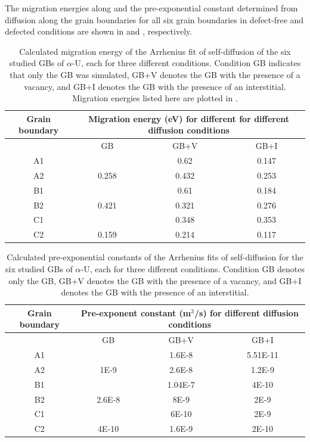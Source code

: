 \documentclass[review]{elsarticle}
\begin{document}
\FloatBarrier

The migration energies along and the pre-exponential constant determined from diffusion along the grain boundaries for all six grain boundaries in defect-free and defected conditions are shown in  and , respectively. 

{\footnotesize
\begin{table}[h!]
    \centering
    \caption{Calculated migration energy of the Arrhenius fit of self-diffusion of the six studied GBs of $\alpha$-U, each for three different conditions. Condition GB indicates that only the GB was simulated, GB+V denotes the GB with the presence of a vacancy, and GB+I denotes the GB with the presence of an interstitial. Migration energies listed here are plotted in . \label{tab:migra}}
\begin{tabular}{|c|c|c|c|}
\hline
\multicolumn{1}{|c}{Grain boundary}
& \multicolumn{3}{|c|}{Migration energy (eV) for different for different diffusion conditions} \\
\hline
 & GB & GB+V & GB+I \\
\hline
A1 &  & 0.62 & 0.147 \\
A2 & 0.258 & 0.432 & 0.253 \\
B1 &  & 0.61 & 0.184 \\
B2 & 0.421 & 0.321 & 0.276 \\
C1 &  & 0.348 & 0.353 \\
C2 & 0.159 & 0.214 & 0.117 \\
\hline
\end{tabular}
\end{table}

\begin{table}[h!]
    \centering
    \caption{Calculated pre-exponential constants of the Arrhenius fits of self-diffusion for the six studied GBs of $\alpha$-U, each for three different conditions. Condition GB denotes only the GB, GB+V denotes the GB with the presence of a vacancy, and GB+I denotes the GB with the presence of an interstitial.\label{tab:pre}}
    \begin{tabular}{|c|c|c|c|}
   \hline
\multicolumn{1}{|c}{Grain boundary}
& \multicolumn{3}{|c|}{ Pre-exponent constant (m$^3$/s) for different diffusion conditions} \\
\hline
 & GB & GB+V & GB+I \\
\hline
A1 &  & 1.6E-8 & 5.51E-11 \\
A2 & 1E-9 & 2.6E-8 & 1.2E-9 \\
B1 &  & 1.04E-7 & 4E-10 \\
B2 & 2.6E-8 & 8E-9 & 2E-9 \\
C1 &  & 6E-10 & 2E-9 \\
C2 & 4E-10 & 1.6E-9 & 2E-10 \\
\hline
    \end{tabular}
\end{table}
}
\end{document}
